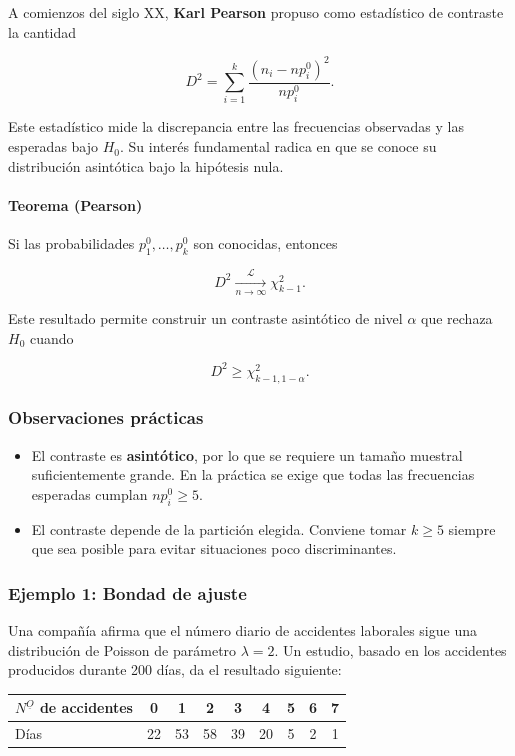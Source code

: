 \documentclass[
]{article}
\providecommand{\tightlist}{%
  \setlength{\itemsep}{0pt}\setlength{\parskip}{0pt}}
\begin{document}
A comienzos del siglo XX, \textbf{Karl Pearson} propuso como estadístico de contraste la cantidad

\[
D^2 = \sum_{i=1}^k \frac{(n_i - n p_i^0)^2}{n p_i^0}.
\]

Este estadístico mide la discrepancia entre las frecuencias observadas y las esperadas bajo \(H_0\). Su interés fundamental radica en que se conoce su distribución asintótica bajo la hipótesis nula.

\paragraph{Teorema (Pearson)}\label{teorema-pearson}

Si las probabilidades \(p_1^0, \ldots, p_k^0\) son conocidas, entonces

\[
D^2 \xrightarrow[n\to\infty]{\mathcal{L}} \chi^2_{k-1}.
\]

Este resultado permite construir un contraste asintótico de nivel \(\alpha\) que rechaza \(H_0\) cuando

\[
D^2 \ge \chi^2_{k-1,1-\alpha}.
\]

\subsubsection{Observaciones prácticas}\label{observaciones-pruxe1cticas}

\begin{itemize}
\tightlist
\item
  El contraste es \textbf{asintótico}, por lo que se requiere un tamaño muestral suficientemente grande. En la práctica se exige que todas las frecuencias esperadas cumplan \(n p_i^0 \ge 5\).
\item
  El contraste depende de la partición elegida. Conviene tomar \(k \ge 5\) siempre que sea posible para evitar situaciones poco discriminantes.
\end{itemize}

\subsubsection{Ejemplo 1: Bondad de ajuste}\label{ejemplo-1-bondad-de-ajuste}

Una compañía afirma que el número diario de accidentes laborales sigue una distribución de Poisson de parámetro \(\lambda=2\). Un estudio, basado en los accidentes producidos durante 200 días, da el resultado siguiente:

\begin{longtable}[]{@{}lcccccccc@{}}
\toprule\noalign{}
\(N^{\underline{O}}\) de accidentes & 0 & 1 & 2 & 3 & 4 & 5 & 6 & 7 \\
\midrule\noalign{}
\endhead
\bottomrule\noalign{}
\endlastfoot
Días & 22 & 53 & 58 & 39 & 20 & 5 & 2 & 1 \\
\end{longtable}
\end{document}
